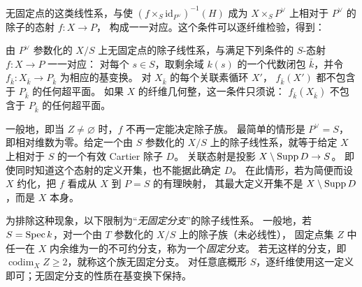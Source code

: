 无固定点的这类线性系，与使
\((f\times_S\mathrm{id}_{P^\vee})^{-1}(H)\)
成为 \(X\times_S P^\vee\) 上相对于 \(P^\vee\) 的除子的态射 \(f:X\to P\)，
构成一一对应。这个条件可以逐纤维检验，得到：


由 \(P^\vee\) 参数化的 \(X/S\) 上无固定点的除子线性系，与满足下列条件的 \(S\)-态射 \(f:X\to P\) 一一对应：
对每个 \(s\in S\)，取剩余域 \(k(s)\) 的一个代数闭包 \(\bar k\)，并令 \(f_{\bar k}:X_{\bar k}\to P_{\bar k}\) 为相应的基变换。
对 \(X_{\bar k}\) 的每个关联素循环 \(X'\)，
\(f_{\bar k}(X')\) 都不包含于 \(P_{\bar k}\) 的任何超平面。
如果 \(X\) 的纤维几何整，这一条件只须说：
\(f_{\bar k}(X_{\bar k})\) 不包含于 \(P_{\bar k}\) 的任何超平面。

一般地，即当 \(Z\ne\varnothing\) 时，\(f\) 不再一定能决定除子族。
最简单的情形是 \(P^\vee=S\)，即相对维数为零。给定一个由 \(S\) 参数化的
\(X/S\) 上的除子线性系，就等于给定 \(X\) 上相对于 \(S\) 的一个有效 Cartier 除子 \(D\)。
关联态射是投影 \(X\setminus\operatorname{Supp} D\to S\)。
即使同时知道这个态射的定义开集，也不能据此确定 \(D\)。
在此情形，若为简便而设 \(X\) 约化，把 \(f\) 看成从 \(X\) 到 \(P=S\) 的有理映射，
其最大定义开集不是 \(X\setminus\operatorname{Supp} D\)，而是 \(X\) 本身。

为排除这种现象，以下限制为“\emph{无固定分支}”的除子线性系。
一般地，若 \(S=\operatorname{Spec} k\)，对一个由 \(T\) 参数化的 \(X/S\) 上的除子族（未必线性），
固定点集 \(Z\) 中任一在 \(X\) 内余维为一的不可约分支，称为一个\emph{固定分支}。
若无这样的分支，即 \(\operatorname{codim}_X Z\geq2\)，就称这个族无固定分支。
对任意底概形 \(S\)，逐纤维使用这一定义即可；无固定分支的性质在基变换下保持。
\par\endgroup
